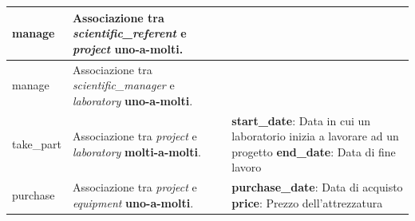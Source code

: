 \begin{tabular}{@{}| p{} | p{} | p{} |}
	\hline
	manage             & \begin{minipage}[t]{0.4\textwidth}
		                     \raggedright
		                     Associazione tra \textit{scientific\_referent} e \textit{project} \textbf{uno-a-molti}.
	                     \end{minipage}
	                   &                                                                                                       \\[15pt]
	\hline
	manage             & \begin{minipage}[t]{0.4\textwidth}
		                     \raggedright
		                     Associazione tra \textit{scientific\_manager} e \textit{laboratory} \textbf{uno-a-molti}.
	                     \end{minipage}
	                   &                                                                                                       \\[15pt]
	\hline
	take\_part         & \begin{minipage}[t]{0.4\textwidth}
		                     \raggedright
		                     Associazione tra \textit{project} e \textit{laboratory} \textbf{molti-a-molti}.
	                     \end{minipage}
	                   & \begin{minipage}[t]{0.3\textwidth}
		                     \raggedright
		                     \textbf{start\_date}: Data in cui un laboratorio inizia a lavorare ad un progetto \sskip
		                     \textbf{end\_date}: Data di fine lavoro
	                     \end{minipage}               \\[55pt]
	\hline
	purchase           & \begin{minipage}[t]{0.4\textwidth}
		                     \raggedright
		                     Associazione tra \textit{project} e \textit{equipment} \textbf{uno-a-molti}.
	                     \end{minipage}              & \begin{minipage}[t]{0.3\textwidth}
		                                                   \raggedright
		                                                   \textbf{purchase\_date}: Data di acquisto\sskip
		                                                   \textbf{price}: Prezzo dell'attrezzatura
	                                                   \end{minipage}                          \\[40pt]

\end{tabular}
